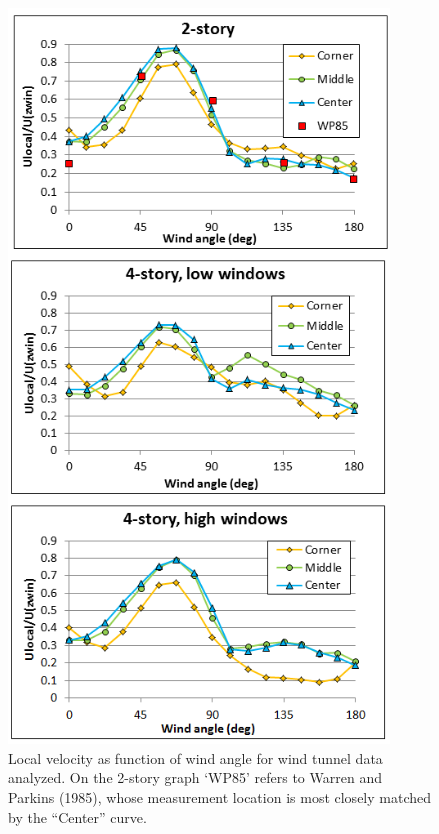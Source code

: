 \begin{figure}[hbtp] %
\centering
\includegraphics[width=0.9\textwidth, height=0.9\textheight, keepaspectratio=true]{media/ss-figure5.png}
\caption{Local velocity as function of wind angle for wind tunnel data analyzed. On the 2-story graph `WP85' refers to Warren and Parkins (1985), whose measurement location is most closely matched by the ``Center'' curve. \protect \label{fig:ss-local-velocity}}
\end{figure}
%
